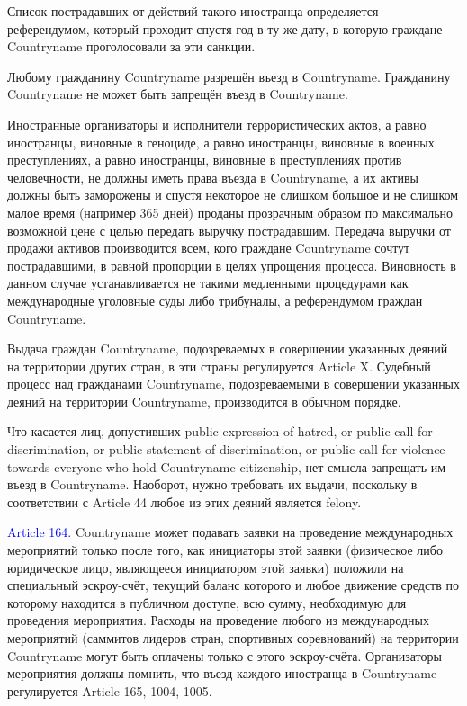 \documentclass[11pt]{article}
\theoremstyle{remark}
\theoremstyle{definition}
\begin{document}
Список пострадавших от действий такого иностранца определяется референдумом, который проходит спустя год в ту же дату, в которую граждане Countryname проголосовали за эти санкции.



Любому гражданину Countryname разрешён въезд в Countryname. Гражданину Countryname не может быть запрещён въезд в Countryname. 


\color{blue}

Иностранные организаторы и исполнители террористических актов, а равно иностранцы, виновные в геноциде, а равно иностранцы, виновные в военных преступлениях, а равно иностранцы, виновные в преступлениях против человечности, не должны иметь права въезда в Countryname, а их активы должны быть заморожены и спустя некоторое не слишком большое и не слишком малое время (например 365 дней) проданы прозрачным образом по максимально возможной цене с целью передать выручку пострадавшим. Передача выручки от продажи активов производится всем, кого граждане Countryname сочтут пострадавшими, в равной пропорции в целях упрощения процесса. Виновность в данном случае устанавливается не такими медленными процедурами как международные уголовные суды либо трибуналы, а референдумом граждан Countryname.

Выдача граждан Countryname, подозреваемых в совершении указанных деяний на территории других стран, в эти страны регулируется Article X. Судебный процесс над гражданами Countryname, подозреваемыми в совершении указанных деяний на территории Countryname, производится в обычном порядке.


Что касается лиц, допустивших public expression of hatred, or public call for discrimination, or public statement of discrimination, or public call for violence towards everyone who hold Countryname citizenship, нет смысла запрещать им въезд в Countryname. Наоборот, нужно требовать их выдачи, поскольку в соответствии с Article 44 любое из этих деяний является felony.



\color{black}


\textcolor{blue}{Article 164.} Countryname может подавать заявки на проведение международных мероприятий только после того, как инициаторы этой заявки (физическое либо юридическое лицо, являющееся инициатором этой заявки) положили на специальный эскроу-счёт, текущий баланс которого и любое движение средств по которому находится в публичном доступе, всю сумму, необходимую для проведения мероприятия. Расходы на проведение любого из международных мероприятий (саммитов лидеров стран, спортивных соревнований) на территории Countryname могут быть оплачены только с этого эскроу-счёта. Организаторы мероприятия должны помнить, что въезд каждого иностранца в Countryname регулируется Article 165, 1004, 1005.
\end{document}
